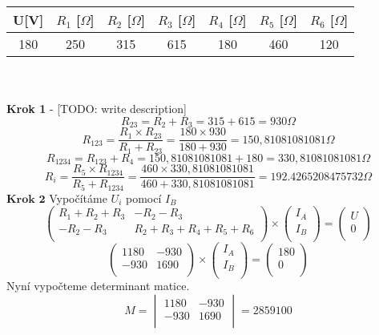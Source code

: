 \documentclass{article}
\begin{document}
\begin{tabular}{| c | c | c | c | c | c | c |}
  \hline
   U[V] & $R_{1}$ [$\Omega$] & $R_{2}$ [$\Omega$]& $R_{3}$ [$\Omega$]& $R_{4}$ [$\Omega$]& $R_{5}$ [$\Omega$]& $R_{6}$ [$\Omega$]\\
  \hline
  180 & 250 & 315 & 615 & 180 & 460 & 120\\
  \hline
\end{tabular}\\
\\
\textbf{Krok 1} - [TODO: write description]\\
\[
  R_{23} = R_{2} + R_{3} = 315 + 615 = 930 \Omega
\]
\[
  R_{123} = \displaystyle\frac{R_{1} \times R_{23}}{R_{1} + R_{23}}=\displaystyle\frac{180 \times 930}{180 + 930} = 150,81081081081 \Omega 
\]
\[
  R_{1234} = R_{123} + R_{4} = 150,81081081081 + 180 = 330,81081081081 \Omega
\]
\[
  R_{i} = \displaystyle\frac{R_{5} \times R_{1234}}{R_{5} + R_{1234}} = \displaystyle\frac{460 \times 330,81081081081}{460 + 330,81081081081} = 192.4265208475732 \Omega
\]
$\textbf{Krok 2}$ Vypočítáme $U_{i}$ pomocí $I_{B}$\\
\[
  \begin{pmatrix}
    R_{1}+R_{2}+R_{3} & -R_{2}-R_{3}\\
    -R_{2}-R_{3} & R_{2}+R_{3}+R_{4}+R_{5}+R_{6}\\
  \end{pmatrix}
  \times
  \begin{pmatrix}
    I_{A}\\
    I_{B}\\
  \end{pmatrix}
  =
  \begin{pmatrix}
    U\\
    0\\
  \end{pmatrix}
\]
\[
  \begin{pmatrix}
    1180 & -930\\
    -930 & 1690\\
  \end{pmatrix}
  \times
  \begin{pmatrix}
    I_{A}\\
    I_{B}\\
  \end{pmatrix}
  =
  \begin{pmatrix}
    180\\
    0\\
  \end{pmatrix}
\]
Nyní vypočteme determinant matice.
\[
  M =
  \begin{vmatrix}
    1180 & -930\\
    -930 & 1690\\
  \end{vmatrix}
  = 2859100
\]
\end{document}
